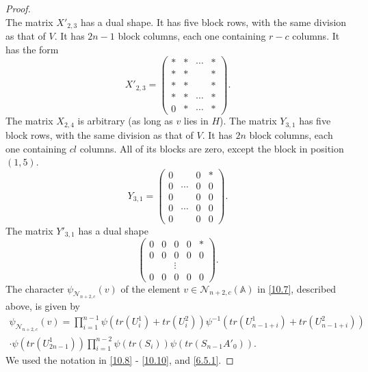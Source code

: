 \documentclass[12pts]{amsart}
\newcommand{\BA}{{\mathbb {A}}}
\begin{document}
\begin{proof}
\begin{equation}
\end{equation}
The matrix $X'_{2,3}$ has a dual shape. It has five block rows, with the same division as that of $V$. It has $2n-1$ block columns, each one containing $r-c$ columns. It has the form
\begin{equation}\label{10.14}
X'_{2,3}=\begin{pmatrix}\ast&\ast&\cdots&\ast\\ \ast&\ast&&\ast\\ \ast&\ast&&\ast\\\ast&\ast&\cdots&\ast\\0&\ast&\cdots&\ast\end{pmatrix}.
\end{equation}
The matrix $X_{2,4}$ is arbitrary (as long as $v$ lies in $H$). The matrix $Y_{3,1}$ has five block rows, with the same division as that of $V$. It has $2n$ block columns, each one containing $cl$ columns. All of its blocks are zero, except the block in position $(1,5)$.
\begin{equation}\label{10.15}
Y_{3,1}=\begin{pmatrix}0&&0&\ast\\0&\cdots&0&0\\
0&&0&0\\0&\cdots&0&0\\0&&0&0\end{pmatrix}.
\end{equation}
The matrix $Y'_{3,1}$ has a dual shape
\begin{equation}\label{10.16}
\begin{pmatrix} 0&0&0&0&\ast\\0&0&0&0&0\\&&\vdots\\0&0&0&0&0\end{pmatrix}.
\end{equation}
The character $\psi_{\mathcal{N}_{n+2,c}}(v)$ of the element $v\in \mathcal{N}_{n+2,c}(\BA)$ in \eqref{10.7}, described above, is given by
\begin{multline}\label{10.17}
 \psi_{\mathcal{N}_{n+2,c}}(v)=\prod_{i=1}^{n-1}\psi(tr(U^1_i)+tr(U^2_i))\psi^{-1}(tr(U^1_{n-1+i})+tr(U^2_{n-1+i}))\\
 \cdot\psi(tr(U^1_{2n-1}))\prod_{i=1}^{n-2}\psi(tr(S_i))\psi(tr(S_{n-1}A'_0)).
 \end{multline}
 We used the notation in \eqref{10.8} - \eqref{10.10}, and \eqref{6.5.1}.
 

\end{proof}
\end{document}
